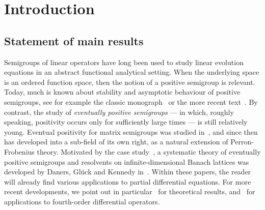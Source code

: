 \documentclass[sn-mathphys]{sn-jnl}%
\theoremstyle{thmstyleone}
\theoremstyle{thmstylethree}
\begin{document}
\section{Introduction}\label{sec:1}

\subsection*{Statement of main results}
Semigroups of linear operators have long been used to study linear evolution equations in an abstract functional analytical setting. When the underlying space is an ordered function space, then the notion of a positive semigroup is relevant. Today, much is known about stability and asymptotic behaviour of positive semigroups, see for example the classic monograph~\cite{AGG} or the more recent text~\cite{BFR}. By contrast, the study of \emph{eventually positive semigroups} --- in which, roughly speaking, positivity occurs only for sufficiently large times --- is still relatively young. Eventual positivity for matrix semigroups was studied in~\cite{NT}, and since then has developed into a sub-field of its own right, as a natural extension of Perron-Frobenius theory. Motivated by the case study~\cite{Dan}, a systematic theory of eventually positive semigroups and resolvents on infinite-dimensional Banach lattices was developed by Daners, Gl\"{u}ck and Kennedy in~\cite{DGK1,DGK2}. Within these papers, the reader will already find various applications to partial differential equations. For more recent developments, we point out in particular~\cite{DG18,ArG21} for theoretical results, and~\cite{DKP,GM} for applications to fourth-order differential operators.
\end{document}
